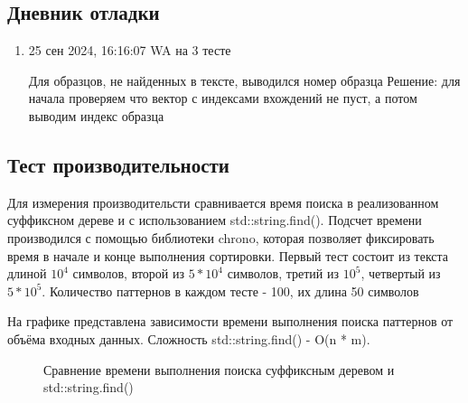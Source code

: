 \documentclass[12pt]{article}
\begin{document}
\subsection*{Дневник отладки}

\begin{enumerate}
    \item 25 сен 2024, 16:16:07 WA на 3 тесте
		
    Для образцов, не найденных в тексте, выводился номер образца
    Решение: для начала проверяем что вектор с индексами вхождений не пуст, а потом выводим индекс образца


\end{enumerate}

\subsection*{Тест производительности}

Для измерения производительсти сравнивается время поиска в реализованном суффиксном дереве и с использованием std::string.find(). Подсчет времени производился с помощью библиотеки chrono, которая позволяет фиксировать время в начале и конце выполнения сортировки. Первый тест состоит из текста длиной $10^4$ символов, второй из $5 *10^4$ символов, третий из $10^5$, четвертый из $5* 10^5$. Количество паттернов в каждом тесте - 100, их длина 50 символов

На графике представлена зависимости времени выполнения поиска паттернов от объёма входных данных. Сложность std::string.find() - O(n * m).


\begin{figure}[htbp]
    \centering
    \caption{Сравнение времени выполнения поиска суффиксным деревом и std::string.find()}
    \label{fig:graph}
\end{figure}
\end{document}
